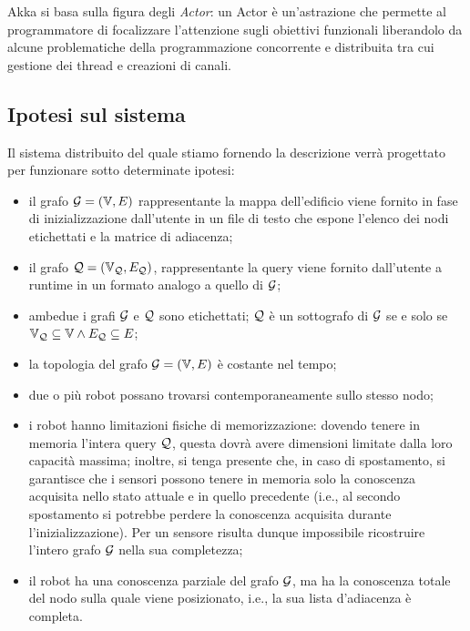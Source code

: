 \documentclass{llncs}
\begin{document}
Akka si basa sulla figura degli \emph{Actor}: un Actor è un'astrazione che permette
al programmatore di focalizzare l'attenzione sugli obiettivi funzionali liberandolo
da alcune problematiche della programmazione
concorrente e distribuita tra cui gestione dei thread e creazioni di canali.
%
\subsection{Ipotesi sul sistema}
\label{sec:hypotesis}
Il sistema distribuito del quale stiamo fornendo la descrizione verrà progettato per funzionare
sotto determinate ipotesi:
\begin{itemize}
\item il grafo $\mathcal{G} = ( \mathbb{V}, E)$ rappresentante la mappa dell'edificio viene fornito
  in fase di inizializzazione dall'utente in un
  file di testo che espone l'elenco dei nodi etichettati e la matrice di adiacenza;
\item il grafo  $\mathcal{Q} = (\mathbb{V}_{\mathcal{Q}}, E_{\mathcal{Q}})$, rappresentante la query viene fornito dall'utente
  a runtime in un formato analogo a quello di $\mathcal{G}$;
\item ambedue i grafi $\mathcal{G}$ e $\mathcal{Q}$ sono etichettati; $\mathcal{Q}$ è un sottografo di $\mathcal{G}$ se e solo se
  $\mathbb{V}_{\mathcal{Q}} \subseteq \mathbb{V} \wedge E_{\mathcal{Q}} \subseteq E$;
\item la topologia del grafo $\mathcal{G} = ( \mathbb{V}, E)$ è costante nel tempo;
\item due o più robot possano trovarsi contemporaneamente sullo stesso nodo;
\item i robot hanno limitazioni fisiche di memorizzazione:
  dovendo tenere in memoria l'intera query $\mathcal{Q}$, questa dovrà avere
  dimensioni limitate dalla loro capacità massima; inoltre,
  si tenga presente che, in caso di spostamento, si garantisce che i sensori
  possono tenere in memoria solo la conoscenza acquisita nello stato attuale e in quello
  precedente (i.e., al secondo spostamento si potrebbe perdere la conoscenza acquisita
  durante l'inizializzazione).
  Per un sensore risulta dunque impossibile ricostruire l'intero grafo $\mathcal{G}$ nella sua completezza;
\item il robot ha una conoscenza parziale del grafo $\mathcal{G}$, ma ha la conoscenza
  totale del nodo sulla quale viene posizionato, i.e., la sua lista d'adiacenza è completa.
\end{itemize}
%
%
\end{document}
